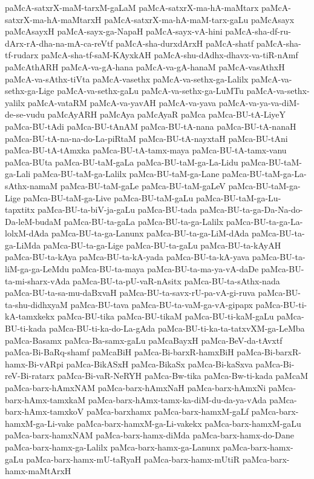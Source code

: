 {paMcA-satxrX-maM-tarxM-gaLaM
paMcA-satxrX-ma-hA-maMtarx
paMcA-satxrX-ma-hA-maMtarxH
paMcA-satxrX-ma-hA-maM-tarx-gaLu
paMcAsayx
paMcAsayxH
paMcA-sayx-ga-NapaH
paMcA-sayx-vA-hini
paMcA-sha-df-ru-dArx-rA-dha-na-mA-ca-reVtf
paMcA-sha-durxdArxH
paMcA-shatf
paMcA-sha-tf-rudarx
paMcA-sha-tf-saM-KAyxkAH
paMcA-shu-dAdhx-dhavx-va-tiR-nAmf
paMcAthARH
paMcA-va-gA-hana
paMcA-va-gA-hanaM
paMcA-vasAthxH
paMcA-va-sAthx-tiVta
paMcA-vasethx
paMcA-va-sethx-ga-Lalilx
paMcA-va-sethx-ga-Lige
paMcA-va-sethx-gaLu
paMcA-va-sethx-ga-LuMTu
paMcA-va-sethx-yalilx
paMcA-vataRM
paMcA-va-yavAH
paMcA-va-yava
paMcA-va-ya-va-diM-de-se-vudu
paMcAyARH
paMcAya
paMcAyaR
paMca
paMca-BU-tA-LiyeY
paMca-BU-tAdi
paMca-BU-tAnAM
paMca-BU-tA-nana
paMca-BU-tA-nanaH
paMca-BU-tA-na-na-do-La-piRtaM
paMca-BU-tA-nayxtaH
paMca-BU-tAni
paMca-BU-tA-tAmxka
paMca-BU-tA-tamx-maya
paMca-BU-tA-tamx-vanu
paMca-BUta
paMca-BU-taM-gaLa
paMca-BU-taM-ga-La-Lidu
paMca-BU-taM-ga-Lali
paMca-BU-taM-ga-Lalilx
paMca-BU-taM-ga-Lane
paMca-BU-taM-ga-La-sAthx-namaM
paMca-BU-taM-gaLe
paMca-BU-taM-gaLeV
paMca-BU-taM-ga-Lige
paMca-BU-taM-ga-Live
paMca-BU-taM-gaLu
paMca-BU-taM-ga-Lu-tapxtitx
paMca-BU-ta-biV-ja-gaLu
paMca-BU-tada
paMca-BU-ta-ga-Da-Na-do-Da-leM-budaM
paMca-BU-ta-gaLa
paMca-BU-ta-ga-Lalilx
paMca-BU-ta-ga-La-lolxM-dAda
paMca-BU-ta-ga-Lanunx
paMca-BU-ta-ga-LiM-dAda
paMca-BU-ta-ga-LiMda
paMca-BU-ta-ga-Lige
paMca-BU-ta-gaLu
paMca-BU-ta-kAyAH
paMca-BU-ta-kAya
paMca-BU-ta-kA-yada
paMca-BU-ta-kA-yava
paMca-BU-ta-liM-ga-ga-LeMdu
paMca-BU-ta-maya
paMca-BU-ta-ma-ya-vA-daDe
paMca-BU-ta-mi-sharx-vAda
paMca-BU-ta-pU-vaR-nAsitx
paMca-BU-ta-sAthx-nada
paMca-BU-ta-sa-mu-daBxvaH
paMca-BU-ta-savx-rU-pa-vA-gi-ruva
paMca-BU-ta-shu-didhxyaM
paMca-BU-tava
paMca-BU-ta-vaM-ga-vA-gipapx
paMca-BU-ti-kA-tamxkekx
paMca-BU-tika
paMca-BU-tikaM
paMca-BU-ti-kaM-gaLu
paMca-BU-ti-kada
paMca-BU-ti-ka-do-La-gAda
paMca-BU-ti-ka-ta-tatxvXM-ga-LeMba
paMca-Basamx
paMca-Ba-samx-gaLu
paMcaBayxH
paMca-BeV-da-tAvxtf
paMca-Bi-BaRq-shamf
paMcaBiH
paMca-Bi-barxR-hamxBiH
paMca-Bi-barxR-hamx-Bi-vARpi
paMca-BikASxH
paMca-BikaSx
paMca-Bi-kaSxva
paMca-Bi-reV-Bi-ratarx
paMca-Bi-vaR-NeRYH
paMca-Bw-tika
paMca-Bw-ti-kada
paMcaM
paMca-barx-hAmxNAM
paMca-barx-hAmxNaH
paMca-barx-hAmxNi
paMca-barx-hAmx-tamxkaM
paMca-barx-hAmx-tamx-ka-diM-du-da-ya-vAda
paMca-barx-hAmx-tamxkoV
paMca-barxhamx
paMca-barx-hamxM-gaLf
paMca-barx-hamxM-ga-Li-vake
paMca-barx-hamxM-ga-Li-vakekx
paMca-barx-hamxM-gaLu
paMca-barx-hamxNAM
paMca-barx-hamx-diMda
paMca-barx-hamx-do-Dane
paMca-barx-hamx-ga-Lalilx
paMca-barx-hamx-ga-Lanunx
paMca-barx-hamx-gaLu
paMca-barx-hamx-mU-taRyaH
paMca-barx-hamx-mUtiR
paMca-barx-hamx-maMtArxH
}

